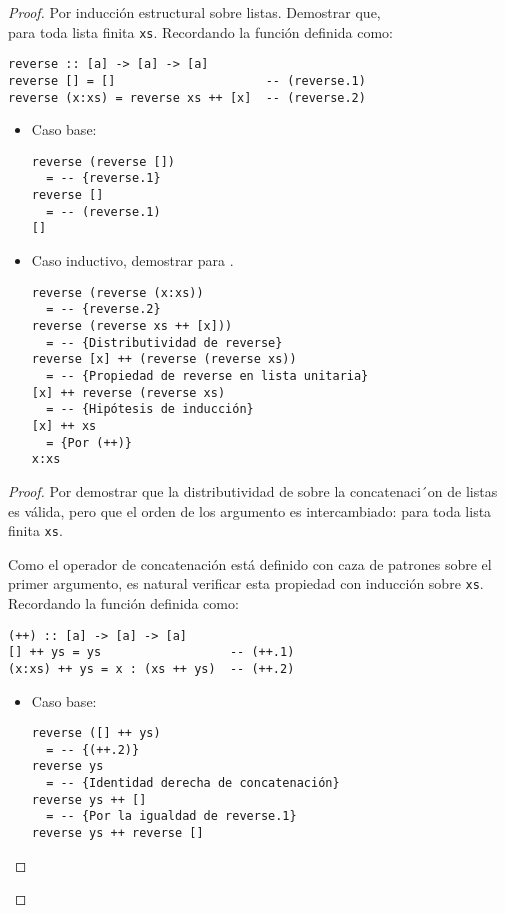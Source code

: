 \begin{proof}
Por inducción estructural sobre listas. Demostrar que,\\
 para toda lista finita \texttt{xs}.
\hfill \break
Recordando la función  definida como:

\begin{verbatim}
reverse :: [a] -> [a] -> [a]
reverse [] = []                     -- (reverse.1)
reverse (x:xs) = reverse xs ++ [x]  -- (reverse.2)
\end{verbatim}

\begin{itemize}
\item Caso base:
\begin{verbatim}
reverse (reverse [])
  = -- {reverse.1}
reverse []
  = -- (reverse.1)
[]
\end{verbatim}

\item Caso inductivo, demostrar para .
\begin{verbatim}
reverse (reverse (x:xs))
  = -- {reverse.2}
reverse (reverse xs ++ [x]))
  = -- {Distributividad de reverse}
reverse [x] ++ (reverse (reverse xs))
  = -- {Propiedad de reverse en lista unitaria}
[x] ++ reverse (reverse xs)
  = -- {Hipótesis de inducción}
[x] ++ xs
  = {Por (++)}
x:xs
\end{verbatim}
\end{itemize}


\begin{proof}
Por demostrar que la distributividad de  sobre la 
concatenaci´on de listas es válida, pero que el orden de los argumento es 
intercambiado:
 para toda lista finita 
\texttt{xs}.

Como el operador de concatenación \hsCode{++} está definido con caza de patrones 
sobre el primer argumento, es natural verificar esta propiedad con inducción 
sobre \texttt{xs}.
Recordando la función \hsCode{(++)} definida como:

\begin{verbatim}
(++) :: [a] -> [a] -> [a]
[] ++ ys = ys                  -- (++.1)
(x:xs) ++ ys = x : (xs ++ ys)  -- (++.2)
\end{verbatim}

\begin{itemize}
\item Caso base:
\begin{verbatim}
reverse ([] ++ ys)
  = -- {(++.2)}
reverse ys
  = -- {Identidad derecha de concatenación}
reverse ys ++ []
  = -- {Por la igualdad de reverse.1}
reverse ys ++ reverse []
\end{verbatim}


\end{itemize}
\end{proof}
\end{proof}
